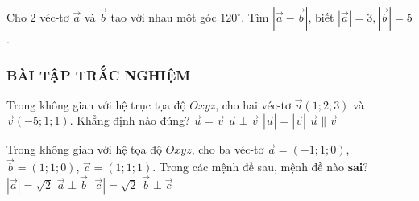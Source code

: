 \begin{vd}%
	Cho 2 véc-tơ $\overrightarrow{a}$ và $\overrightarrow{b}$ tạo với nhau một góc $120^\circ$. Tìm $\left|\overrightarrow{a}-\overrightarrow{b}\right|$, biết $|\overrightarrow{a}|=3,\left|\overrightarrow{b}\right|=5$.
\end{vd}
\subsubsection{BÀI TẬP TRẮC NGHIỆM}
\begin{ex}%
	Trong không gian với hệ trục tọa độ $Oxyz$, cho hai véc-tơ $\vec{u}\left(1;2;3\right)$ và $\vec{v}\left(-5;1;1\right)$. Khẳng định nào đúng?
	\choice
	{$\vec{u}=\vec{v}$}
	{\True $\vec{u}\perp \vec{v}$}
	{$\left| \vec{u}\right|=\left| \vec{v}\right|$}
	{$\vec{u}\parallel\vec{v}$}
\end{ex}
\begin{ex}%
	Trong không gian với hệ tọa độ $Oxyz$, cho ba véc-tơ $ \overrightarrow{a}=(-1;1;0) $, $  \overrightarrow{b}=(1;1;0) $, $ \overrightarrow{c}=(1;1;1) $. Trong các mệnh đề sau, mệnh đề nào \textbf{sai}?
	\choice
	{$\left|\overrightarrow{a}\right| = \sqrt{2} $}
	{$ \overrightarrow{a} \perp \overrightarrow{b} $}
	{$ \left|\overrightarrow{c}\right| = \sqrt{2}$}
	{\True $ \overrightarrow{b} \perp \overrightarrow{c} $}
\end{ex}
